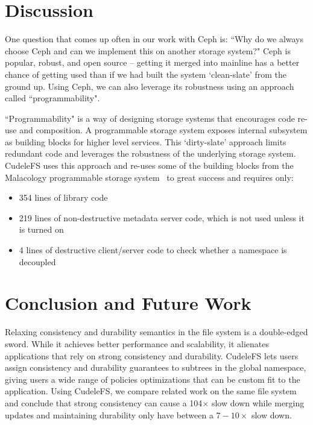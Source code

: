 \section{Discussion}

One question that comes up often in our work with Ceph is: ``Why do we always
choose Ceph and can we implement this on another storage system?" Ceph is
popular, robust, and open source -- getting it merged into mainline has a
better chance of getting used than if we had built the system `clean-slate'
from the ground up. Using Ceph, we can also leverage its robustness using an
approach called ``programmability".

``Programmability" is a way of designing storage systems that encourages code
re-use and composition.  A programmable storage system exposes internal
subsystem as building blocks for higher level services. This `dirty-slate'
approach limits redundant code and leverages the robustness of the underlying
storage system. CudeleFS uses this approach and re-uses some of the building
blocks from the Malacology programmable storage system~\cite{sevilla:eurosys17}
to great success and requires only:

\begin{itemize}

  \item 354 lines of library code

  \item 219 lines of non-destructive metadata server code, which is not used
  unless it is turned on

  \item 4 lines of destructive client/server code to check whether a namespace
  is decoupled

\end{itemize}

\section{Conclusion and Future Work}

Relaxing consistency and durability semantics in the file system is a
double-edged sword. While it achieves better performance and scalability, it
alienates applications that rely on strong consistency and durability. CudeleFS
lets users assign consistency and durability guarantees to subtrees in
the global namespace, giving users a wide range of policies
optimizations that can be custom fit to the application. Using CudeleFS, we
compare related work on the same file system and conclude that strong
consistency can cause a 104\(\times\) slow down while merging updates and
maintaining durability only have between a \(7-10\times\) slow down.




